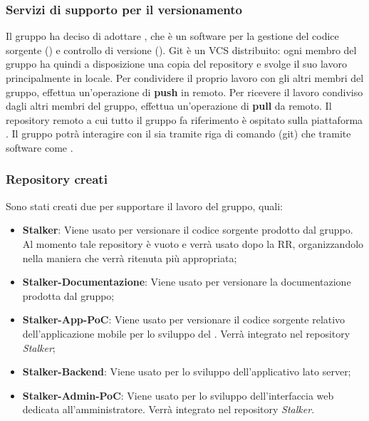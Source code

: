 \subsubsection{Servizi di supporto per il versionamento} 
Il gruppo ha deciso di adottare , che è un software per la gestione del codice sorgente () e controllo di versione ().
Git è un VCS distribuito: ogni membro del gruppo \Gruppo{} ha quindi a disposizione una copia del repository e svolge il suo lavoro principalmente in locale.
Per condividere il proprio lavoro con gli altri membri del gruppo, effettua un'operazione di \textbf{push} in remoto.
Per ricevere il lavoro condiviso dagli altri membri del gruppo, effettua un'operazione di \textbf{pull} da remoto.
Il repository remoto a cui tutto il gruppo fa riferimento è ospitato sulla piattaforma .
Il gruppo \Gruppo{} potrà interagire con il  sia tramite riga di comando (git) che tramite software come .

\subsubsection{Repository creati}
Sono stati creati due  per supportare il lavoro del gruppo, quali:
\begin{itemize}
	\item \textbf{Stalker}: Viene usato per versionare il codice sorgente prodotto dal gruppo. Al momento tale repository è vuoto e verrà usato dopo la RR, organizzandolo nella maniera che verrà ritenuta più appropriata;
	\item \textbf{Stalker-Documentazione}: Viene usato per versionare la documentazione prodotta dal gruppo;
	\item \textbf{Stalker-App-PoC}: Viene usato per versionare il codice sorgente relativo dell'applicazione mobile per lo sviluppo del . Verrà integrato nel repository \textit{Stalker};
	\item \textbf{Stalker-Backend}: Viene usato per lo sviluppo dell'applicativo lato server;
	\item \textbf{Stalker-Admin-PoC}: Viene usato per lo sviluppo dell'interfaccia web dedicata all'amministratore. Verrà integrato nel repository \textit{Stalker}.
\end{itemize}


